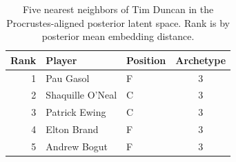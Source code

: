 \begin{table}[htbp]
  \centering\small
  \begin{tabular}{rllc}
    \toprule
    Rank & Player & Position & Archetype \\
    \midrule
    1 & Pau Gasol & F & 3 \\
    2 & Shaquille O'Neal & C & 3 \\
    3 & Patrick Ewing & C & 3 \\
    4 & Elton Brand & F & 3 \\
    5 & Andrew Bogut & F & 3 \\
    \bottomrule
  \end{tabular}
  \caption{Five nearest neighbors of Tim Duncan in the Procrustes-aligned posterior latent space. Rank is by posterior mean embedding distance.}
  \label{tab:Tim_Duncan_neighbors}
\end{table}


